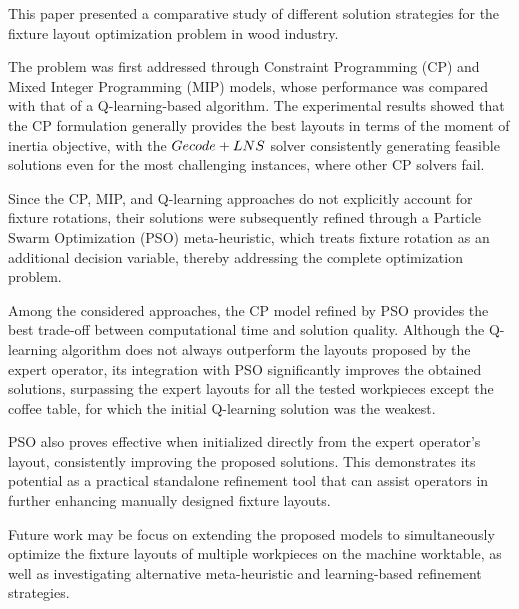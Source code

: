 \label{sec:conclusions}
This paper presented a comparative study of different solution strategies for the fixture layout optimization problem in wood industry.

The problem was first addressed through Constraint Programming (CP) and Mixed Integer Programming (MIP) models, whose performance was compared with that of a Q-learning-based algorithm. The experimental results showed that the CP formulation generally provides the best layouts in terms of the moment of inertia objective, with the $Gecode+LNS$ solver consistently generating feasible solutions even for the most challenging instances, where other CP solvers fail.

Since the CP, MIP, and Q-learning approaches do not explicitly account for fixture rotations, their solutions were subsequently refined through a Particle Swarm Optimization (PSO) meta-heuristic, which treats fixture rotation as an additional decision variable, thereby addressing the complete optimization problem.

Among the considered approaches, the CP model refined by PSO provides the best trade-off between computational time and solution quality. Although the Q-learning algorithm does not always outperform the layouts proposed by the expert operator, its integration with PSO significantly improves the obtained solutions, surpassing the expert layouts for all the tested workpieces except the coffee table, for which the initial Q-learning solution was the weakest.

PSO also proves effective when initialized directly from the expert operator's layout, consistently improving the proposed solutions. This demonstrates its potential as a practical standalone refinement tool that can assist operators in further enhancing manually designed fixture layouts.

Future work may be focus on extending the proposed models to simultaneously optimize the fixture layouts of multiple workpieces on the machine worktable, as well as investigating alternative meta-heuristic and learning-based refinement strategies.

